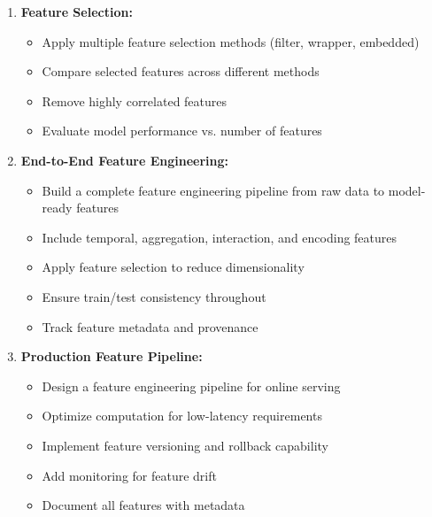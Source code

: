 \begin{enumerate}
    \item \textbf{Feature Selection:}
    \begin{itemize}
        \item Apply multiple feature selection methods (filter, wrapper, embedded)
        \item Compare selected features across different methods
        \item Remove highly correlated features
        \item Evaluate model performance vs. number of features
    \end{itemize}

    \item \textbf{End-to-End Feature Engineering:}
    \begin{itemize}
        \item Build a complete feature engineering pipeline from raw data to model-ready features
        \item Include temporal, aggregation, interaction, and encoding features
        \item Apply feature selection to reduce dimensionality
        \item Ensure train/test consistency throughout
        \item Track feature metadata and provenance
    \end{itemize}

    \item \textbf{Production Feature Pipeline:}
    \begin{itemize}
        \item Design a feature engineering pipeline for online serving
        \item Optimize computation for low-latency requirements
        \item Implement feature versioning and rollback capability
        \item Add monitoring for feature drift
        \item Document all features with metadata
    \end{itemize}
\end{enumerate}
